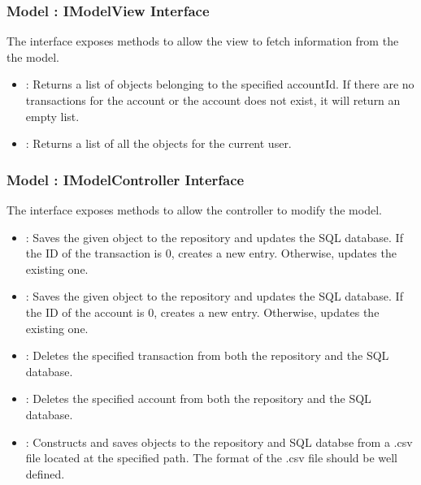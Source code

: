 \documentclass[12pt]{article}
\begin{document}
\subsubsection{Model : IModelView Interface}
The  interface exposes methods to allow the view to fetch information from the the model.\\
\begin{itemize}
	\item {} : Returns a list of  objects belonging to the specified accountId. If there are no transactions for the account or the account does not exist, it will return an empty list.
	\item {} : Returns a list of all the  objects for the current user.
\end{itemize}

\subsubsection{Model : IModelController Interface}
The  interface exposes methods to allow the controller to modify the model.\\
\begin{itemize}
	\item {} : Saves the given  object to the repository and updates the SQL database. If the ID of the transaction is 0, creates a new entry. Otherwise, updates the existing one.
	\item {} : Saves the given  object to the repository and updates the SQL database. If the ID of the account is 0, creates a new entry. Otherwise, updates the existing one.
	\item {} : Deletes the specified transaction from both the repository and the SQL database.
	\item {} : Deletes the specified account from both the repository and the SQL database.
	\item {} : Constructs and saves  objects to the repository and SQL databse from a .csv file located at the specified path. The format of the .csv file should be well defined.
\end{itemize}
\end{document}
